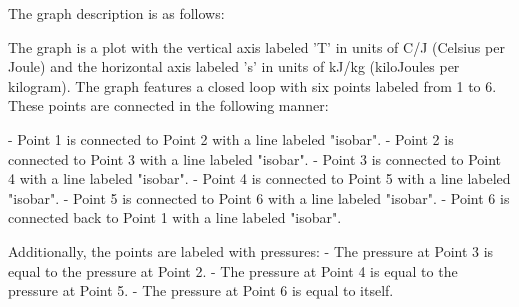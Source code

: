 The graph description is as follows:

The graph is a plot with the vertical axis labeled 'T' in units of C/J (Celsius per Joule) and the horizontal axis labeled 's' in units of kJ/kg (kiloJoules per kilogram). The graph features a closed loop with six points labeled from 1 to 6. These points are connected in the following manner:

- Point 1 is connected to Point 2 with a line labeled "isobar".
- Point 2 is connected to Point 3 with a line labeled "isobar".
- Point 3 is connected to Point 4 with a line labeled "isobar".
- Point 4 is connected to Point 5 with a line labeled "isobar".
- Point 5 is connected to Point 6 with a line labeled "isobar".
- Point 6 is connected back to Point 1 with a line labeled "isobar".

Additionally, the points are labeled with pressures:
- The pressure at Point 3 is equal to the pressure at Point 2.
- The pressure at Point 4 is equal to the pressure at Point 5.
- The pressure at Point 6 is equal to itself.